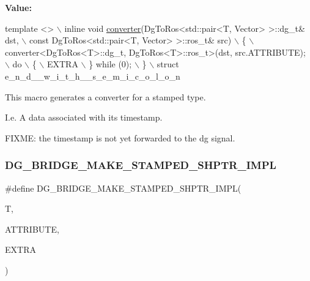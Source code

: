 {\bfseries Value\+:}
\begin{DoxyCode}
\textcolor{keyword}{template} <>                                                             \(\backslash\)
    inline \textcolor{keywordtype}{void} \hyperlink{namespacedynamic__graph_a38ff488b8b21c0b4f4d7f44572fa4ee5}{converter}(DgToRos<std::pair<T, Vector> >::dg\_t& dst,        \(\backslash\)
                          \textcolor{keyword}{const} DgToRos<std::pair<T, Vector> >::ros\_t& src) \(\backslash\)
    \{                                                                       \(\backslash\)
        converter<DgToRos<T>::dg\_t, DgToRos<T>::ros\_t>(dst, src.ATTRIBUTE); \(\backslash\)
        do                                                                  \(\backslash\)
        \{                                                                   \(\backslash\)
            EXTRA                                                           \(\backslash\)
        \} \textcolor{keywordflow}{while} (0);                                                        \(\backslash\)
    \}                                                                       \(\backslash\)
    struct e\_n\_d\_\_w\_i\_t\_h\_\_s\_e\_m\_i\_c\_o\_l\_o\_n
\end{DoxyCode}


This macro generates a converter for a stamped type. 

I.\+e. A data associated with its timestamp.

F\+I\+X\+ME\+: the timestamp is not yet forwarded to the dg signal. \mbox{\label{converter_8hh_a2c8d741da8bc5978c852fb7b71ec26e7}} 
\subsubsection{\texorpdfstring{D\+G\+\_\+\+B\+R\+I\+D\+G\+E\+\_\+\+M\+A\+K\+E\+\_\+\+S\+T\+A\+M\+P\+E\+D\+\_\+\+S\+H\+P\+T\+R\+\_\+\+I\+M\+PL}{DG\_BRIDGE\_MAKE\_STAMPED\_SHPTR\_IMPL}}
{\footnotesize\ttfamily \#define D\+G\+\_\+\+B\+R\+I\+D\+G\+E\+\_\+\+M\+A\+K\+E\+\_\+\+S\+T\+A\+M\+P\+E\+D\+\_\+\+S\+H\+P\+T\+R\+\_\+\+I\+M\+PL(\begin{DoxyParamCaption}\item[{}]{T,  }\item[{}]{A\+T\+T\+R\+I\+B\+U\+TE,  }\item[{}]{E\+X\+T\+RA }\end{DoxyParamCaption})}


